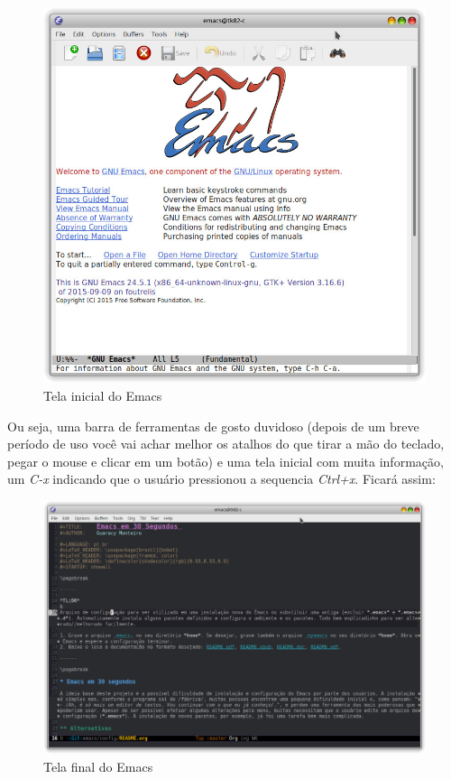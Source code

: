 \documentclass[]{article}
\begin{document}
\begin{figure}[htbp]
\centering
\includegraphics{./images/emacs1.jpg}
\caption{Tela inicial do Emacs}
\end{figure}

Ou seja, uma barra de ferramentas de gosto duvidoso (depois de um breve
período de uso você vai achar melhor os atalhos do que tirar a mão do
teclado, pegar o mouse e clicar em um botão) e uma tela inicial com
muita informação, um \emph{C-x} indicando que o usuário pressionou a
sequencia \emph{Ctrl+x}. Ficará assim:

\begin{figure}[htbp]
\centering
\includegraphics{./images/emacs2.jpg}
\caption{Tela final do Emacs}
\end{figure}
\end{document}
